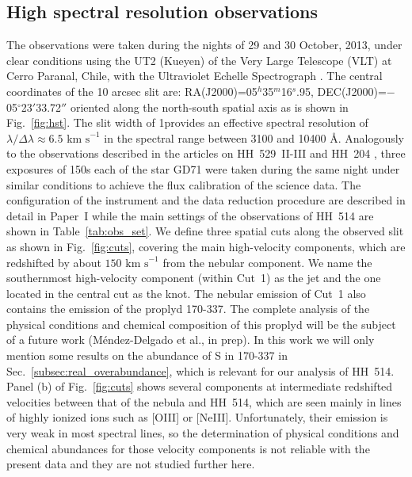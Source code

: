 \documentclass[fleqn,usenatbib]{mnras}
\begin{document}
\subsection{High spectral resolution observations}
\label{sec:data_uves}

The observations were taken during the nights of 29 and 30 October, 2013, under clear conditions using the UT2 (Kueyen) of the Very Large Telescope (VLT) at Cerro Paranal, Chile, with the Ultraviolet Echelle Spectrograph \citep[UVES;][]{Dodorico00}. The central coordinates of the 10 arcsec slit are: RA(J2000)=05$^h$35$^m$16$^s$.95, DEC(J2000)=$-$05$^{\circ}$23$'$33.72$''$ oriented along the north-south spatial axis as is shown in Fig.~\ref{fig:hst}. The slit width of 1\arcsec provides an effective spectral resolution of $\lambda/\Delta \lambda \approx 6.5 \text{ km s}^{-1}$ in the spectral range between 3100 and 10400 \AA. Analogously to the observations described in the articles on HH~529~II-III and HH~204 \citep[][hereinafter Paper~I and Paper~II, respectively]{mendez2021,mendez2021-2}, three exposures of 150s each of the star GD71 \citep{Moehler14a, Moehler14b} were taken during the same night under similar conditions to achieve the flux calibration of the science data. The configuration of the instrument and the data reduction procedure are described in detail in Paper~I while the main settings of the observations of HH~514 are shown in Table~\ref{tab:obs_set}. We define three spatial cuts along the observed slit as shown in Fig.~\ref{fig:cuts}, covering the main high-velocity components,
which are redshifted by about $150\text{ km s}^{-1}$ from the nebular component.
We name the southernmost high-velocity component (within Cut~1) as the jet and the one located in the central cut as the knot. The nebular emission of Cut~1 also contains the emission of the proplyd 170-337. The complete analysis of the physical conditions and chemical composition of this proplyd will be the subject of a future work (M\'endez-Delgado et al., in prep). In this work we will only mention some results on the abundance of S in 170-337 in Sec.~\ref{subsec:real_overabundance}, which is relevant for our analysis of HH~514. Panel (b) of Fig.~\ref{fig:cuts} shows several components at intermediate redshifted velocities between that of the nebula and HH~514, which are seen mainly in lines of highly ionized ions such as [O\thinspace III] or [Ne\thinspace III]. Unfortunately, their emission is very weak in most spectral lines, so the determination of physical conditions and chemical abundances for those velocity components is not reliable with the present data and they are not studied further here.
\end{document}
